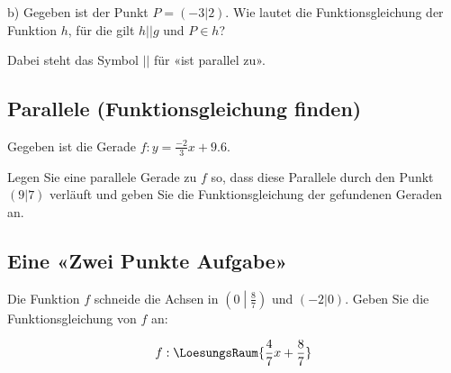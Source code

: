 b) Gegeben ist der Punkt $P=(-3|2)$. Wie lautet die Funktionsgleichung der Funktion $h$, für die gilt
$h||g$ und $P\in h$?

Dabei steht das Symbol $||$ für «ist parallel zu».


\subsection{Parallele (Funktionsgleichung finden)}

Gegeben ist die Gerade $f: y=\frac{-2}3x+9.6$.

Legen Sie eine parallele Gerade zu $f$ so, dass diese Parallele durch
den Punkt $(9|7)$ verläuft und geben Sie die Funktionsgleichung der
gefundenen Geraden an.

\vspace{15mm}



\subsection{Eine «Zwei Punkte Aufgabe»}
Die Funktion $f$ schneide die Achsen in $\left(0\middle|\frac87\right)$ und
$(-2|0)$. Geben Sie die Funktionsgleichung von $f$ an:

\vspace{20mm}

$$f: \LoesungsRaum{\frac47x + \frac87}$$


